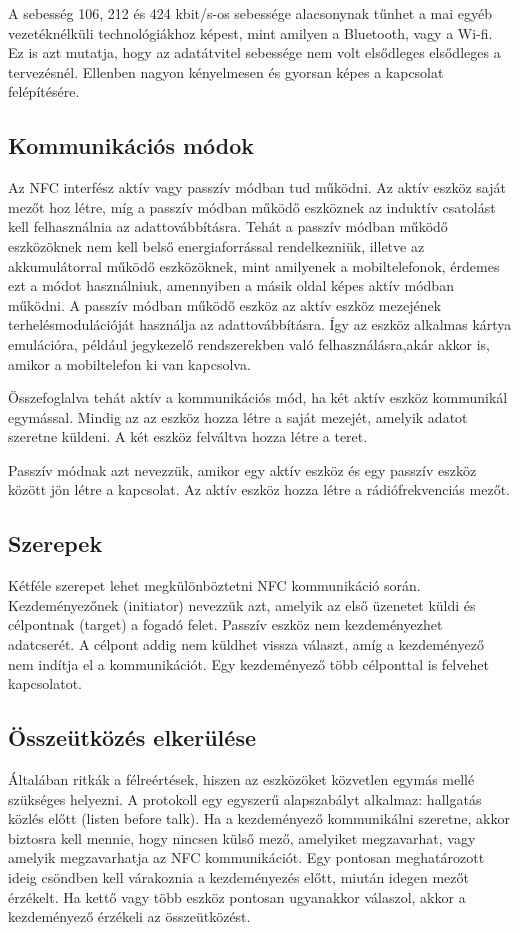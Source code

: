 \documentclass[12pt]{article}
\begin{document}
A sebesség 106, 212 és 424 kbit/s-os sebessége alacsonynak tűnhet a mai egyéb
vezetéknélküli technológiákhoz képest, mint amilyen a Bluetooth, vagy a Wi-fi.
Ez is azt mutatja, hogy az adatátvitel sebessége nem volt elsődleges elsődleges
a tervezésnél. Ellenben nagyon kényelmesen és gyorsan képes a kapcsolat
felépítésére.

\subsection{Kommunikációs módok}
Az NFC interfész aktív vagy passzív módban tud működni. Az aktív eszköz saját
mezőt hoz létre, míg a passzív módban működő eszköznek az induktív csatolást
kell felhasználnia az adattovábbításra. Tehát a passzív módban működő eszközöknek
nem kell belső energiaforrással rendelkezniük, illetve az akkumulátorral működő
eszközöknek, mint amilyenek a mobiltelefonok, érdemes ezt a módot használniuk, 
amennyiben a másik oldal képes aktív módban működni. A passzív módban működő
eszköz az aktív eszköz mezejének terhelésmodulációját használja az
adattovábbításra. Így az eszköz alkalmas kártya emulációra, például 
jegykezelő rendszerekben való felhasználásra,akár  akkor is, amikor a mobiltelefon
ki van kapcsolva.

Összefoglalva tehát aktív a kommunikációs mód, ha két aktív eszköz kommunikál 
egymással. Mindig az az eszköz hozza létre a saját mezejét, amelyik adatot
szeretne küldeni. A két eszköz felváltva hozza létre a teret.

Passzív módnak azt nevezzük, amikor egy aktív eszköz és egy passzív eszköz között
jön létre a kapcsolat. Az aktív eszköz hozza létre a rádiófrekvenciás mezőt.

\subsection{Szerepek}
Kétféle szerepet lehet megkülönböztetni NFC kommunikáció során. Kezdeményezőnek 
(initiator) nevezzük azt, amelyik az első üzenetet küldi és célpontnak (target)
a fogadó felet. Passzív eszköz nem kezdeményezhet adatcserét. A célpont addig 
nem küldhet vissza választ, amíg a kezdeményező nem indítja el a kommunikációt.
Egy kezdeményező több célponttal is felvehet kapcsolatot.

\subsection{Összeütközés elkerülése}
Általában ritkák a félreértések, hiszen az eszközöket közvetlen egymás mellé 
szükséges helyezni. A protokoll egy egyszerű alapszabályt alkalmaz: hallgatás
közlés előtt (listen before talk). Ha a kezdeményező kommunikálni szeretne,
akkor biztosra kell mennie, hogy nincsen külső mező, amelyiket megzavarhat,
vagy amelyik megzavarhatja az NFC kommunikációt. Egy pontosan meghatározott 
ideig csöndben kell várakoznia a kezdeményezés előtt, miután idegen mezőt 
érzékelt. Ha kettő vagy több eszköz pontosan ugyanakkor válaszol, akkor a
kezdeményező érzékeli az összeütközést.
\end{document}
